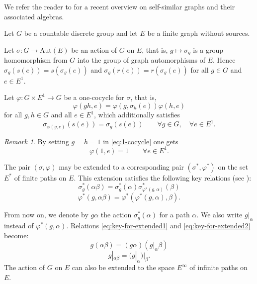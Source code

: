 \documentclass[11pt]{amsart}
\theoremstyle{plain}            %
\theoremstyle{definition}       %
\theoremstyle{definition}       %
\theoremstyle{remark}
\newtheorem{remark}[theorem]{Remark}
\newcommand{\Aut}{\mathrm{Aut}}
\begin{document}
We refer the reader to \cite{Pardo} for a recent overview on self-similar graphs and their associated algebras. 

Let $G$ be a countable discrete group and let $E$ be a finite graph without sources. 

Let $\sigma \colon G \to \Aut (E)$ be an action of $G$ on $E$, that is, $g\mapsto \sigma_g$ is a group homomorphism from $G$ into the group of graph automorphisms of $E$. Hence $\sigma_g (s(e))= s(\sigma_g(e))$ and $\sigma_g (r(e)) = r(\sigma_g (e))$ for all $g\in G$ and $e\in E^1$. 


Let $\varphi\colon G\times E^1\to G$ be a one-cocycle for $\sigma$, that is,
\begin{equation}
	\label{eq:1-cocycle}
	\varphi (gh,e) = \varphi (g,\sigma_h(e))\varphi (h,e)
\end{equation}
for all $g,h\in G$ and all $e\in E^1$, which additionally satisfies
\begin{equation}
	\label{eq:additiona-self-sim}
	\sigma_{\varphi (g,e)}(s(e)) = \sigma _g (s(e)) \qquad \forall g\in G,\quad \forall e\in E^1. 
\end{equation}



\begin{remark}
	\label{rem:forEP-relations}
	By setting $g=h=1$ in \eqref{eq:1-cocycle} one gets 
	\begin{equation}
		\label{eq:one-in-one-cocycle}
		\varphi (1,e)= 1 \qquad \forall e\in E^1.
	\end{equation}
\end{remark}

The pair $(\sigma, \varphi)$ may be extended to a corresponding pair $(\sigma^*,\varphi^*)$ on the set $E^*$ of finite paths on $E$. This extension satisfies the following key relations (see \cite[Proposition 2.4]{ep17}):
\begin{equation}
	\label{eq:key-for-extended1}
	\sigma_g^* (\alpha\beta) = \sigma_g^* (\alpha)\sigma^* _{\varphi^* (g,\alpha)}(\beta) 
\end{equation}
\begin{equation}
	\label{eq:key-for-extended2}
	\varphi^* (g,\alpha\beta) = \varphi^* (\varphi^* (g,\alpha),\beta).
\end{equation}

From now on, we denote by $g\alpha$ the action $\sigma^*_g(\alpha)$ for a path $\alpha$. We also write $g|_{\alpha}$ instead of $\varphi^* (g,\alpha)$. Relations \eqref{eq:key-for-extended1} and \eqref{eq:key-for-extended2} become:
\begin{equation}
	\label{eq:key-for-extendedNewNot1}
	g (\alpha\beta) = (g \alpha) (g|_\alpha \beta) 
\end{equation}
\begin{equation}
	\label{eq:key-for-extendedNewNot2}
 g|_{\alpha\beta} = (g|_\alpha)|_\beta.
\end{equation}
The action of $G$ on $E$ can also be extended to the space $E^{\infty}$ of infinite paths on $E$. 
\end{document}
